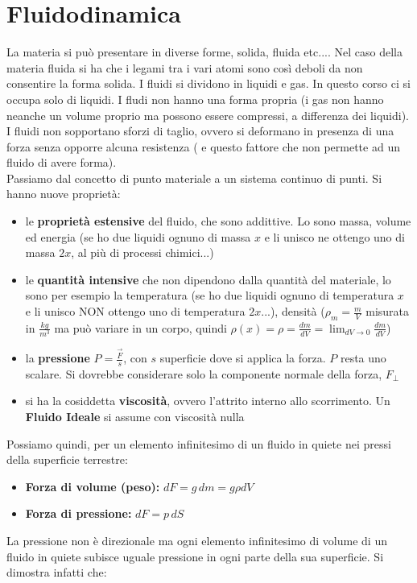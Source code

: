 \documentclass[a4paper,12pt, oneside]{book}
\begin{document}
\chapter{Fluidodinamica}
La materia si può presentare in diverse forme, solida, fluida etc.... Nel caso della materia fluida si ha che i legami tra i vari atomi sono così deboli da non consentire la forma solida. I fluidi si dividono in liquidi e gas. In questo corso ci si occupa solo di liquidi. I fludi non hanno una forma propria (i gas non hanno neanche un volume proprio ma possono essere compressi, a differenza dei liquidi). I fluidi non sopportano sforzi di taglio, ovvero si deformano in presenza di una forza senza opporre alcuna resistenza ( e questo fattore che non permette ad un fluido di avere forma). \\
Passiamo dal concetto di punto materiale a un sistema continuo di punti. Si hanno nuove proprietà:
\begin{itemize}
	\item le \textbf{proprietà estensive} del fluido, che sono addittive. Lo sono massa, volume ed energia (se ho due liquidi ognuno di massa $x$ e li unisco ne ottengo uno di massa $2x$, al più di processi chimici...)
	\item le \textbf{quantità intensive} che non dipendono dalla quantità del materiale, lo sono per esempio la temperatura (se ho due liquidi ognuno di temperatura $x$ e li unisco NON ottengo uno di temperatura $2x$...), densità ($\rho_m=\frac{m}{V}$ misurata in $\frac{kg}{m^3}$ ma può variare in un corpo, quindi $\rho(x)=\rho=\frac{dm}{dV}=\lim_{dV\to 0}\frac{dm}{dV}$)
	\item la \textbf{pressione} $P=\frac{\vec{F}}{s}$, con $s$ superficie dove si applica la forza. $P$ resta uno scalare. Si dovrebbe considerare solo la componente normale della forza, $F_{\perp}$
	\item si ha la cosiddetta \textbf{viscosità}, ovvero l'attrito interno allo scorrimento. Un \textbf{Fluido Ideale} si assume con viscosità nulla
\end{itemize}
Possiamo quindi, per un elemento infinitesimo di un fluido in quiete nei pressi della superficie terrestre:
\begin{itemize}
	\item \textbf{Forza di volume (peso):} $dF=g\,dm=g\rho dV$
	\item \textbf{Forza di pressione:} $dF= p\, dS$
\end{itemize}
La pressione non è direzionale ma ogni elemento infinitesimo di volume di un fluido in quiete subisce uguale pressione in ogni parte della sua superficie. Si dimostra infatti che:
\end{document}
